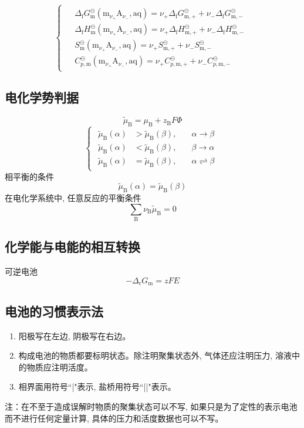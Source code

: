 \documentclass[twocolumn]{article}
\newcommand{\equ}[1]{\begin{equation*}#1\end{equation*}}
\newcommand{\drgm}{\Delta_{\mathrm{r}}G_{\rmm}}
\newcommand{\dfgm}{\Delta_{\mathrm{f}}G_{\rmm}}
\newcommand{\dfhm}{\Delta_{\mathrm{f}}H_{\rmm}}
\newcommand{\nup}{\nu_{+}}
\newcommand{\num}{\nu_{-}}
\newcommand{\MnuAnu}{\rmm_{\nup}\mathrm{A}_{\num}}
\newcommand{\aq}{\mathrm{aq}}
\newcommand{\rmB}{\mathrm{B}}
\newcommand{\rmm}{\mathrm{m}}
\newcommand{\subB}{_{\rmB}}
\newcommand{\subm}{_{\rmm}}
\newcommand{\std}{^{\circleddash}}
\newcommand{\nuB}{\nu\subB}
\newcommand{\xkh}[1]{\left(#1\right)}
\begin{document}
\equ{\begin{cases}\begin{aligned}
& \dfgm\std\xkh{\MnuAnu, \aq}=\nup\Delta_{\mathrm{f}}G_{\rmm, +}\std+\num\Delta_{\mathrm{f}}G_{\rmm, -}\std\\
& \dfhm\std\xkh{\MnuAnu, \aq}=\nup\Delta_{\mathrm{f}}H_{\rmm, +}\std+\num\Delta_{\mathrm{f}}H_{\rmm, -}\std\\
& S\subm\std\xkh{\MnuAnu, \aq}=\nup S_{\rmm, +}\std+\num S_{\rmm, -}\std\\
& C_{p, \rmm}\std\xkh{\MnuAnu, \aq}=\nup C_{p, \rmm, +}\std+\num C_{p, \rmm, -}\std
\end{aligned}
\end{cases}
}
\subsection{电化学势判据}
\equ{\widetilde\mu\subB=\mu\subB+z\subB F \Phi}
\equ{\begin{cases}\begin{aligned}
\widetilde\mu\subB\xkh{\alpha}&>\widetilde\mu\subB\xkh{\beta}, \quad &\alpha\to\beta\\
\widetilde\mu\subB\xkh{\alpha}&<\widetilde\mu\subB\xkh{\beta}, &\beta\to\alpha\\
\widetilde\mu\subB\xkh{\alpha}&=\widetilde\mu\subB\xkh{\beta}, &\alpha\rightleftharpoons\beta
\end{aligned}
\end{cases}}
相平衡的条件
\equ{\widetilde\mu\subB\xkh{\alpha}=\widetilde\mu\subB\xkh{\beta}}
在电化学系统中, 任意反应的平衡条件
\equ{\sum\subB\nuB\widetilde\mu\subB=0}
\subsection{化学能与电能的相互转换}
可逆电池
\equ{-\drgm=zFE}
\subsection{电池的习惯表示法}
\begin{enumerate}
\item 阳极写在左边, 阴极写在右边。
\item 构成电池的物质都要标明状态。除注明聚集状态外, 气体还应注明压力, 溶液中的物质应注明活度。
\item 相界面用符号``|"表示, 盐桥用符号``||"表示。
\end{enumerate}
注：在不至于造成误解时物质的聚集状态可以不写, 如果只是为了定性的表示电池而不进行任何定量计算, 具体的压力和活度数据也可以不写。
\end{document}
